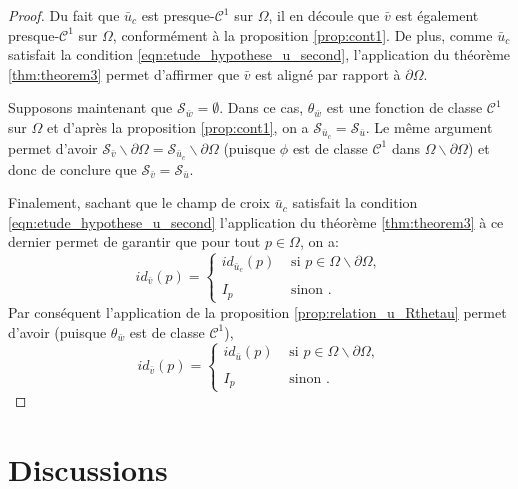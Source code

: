 \begin{proof}
Du fait que $\bar{u}_c$ est presque-$\mathcal{C}^1$ sur $\Omega$, il en découle que $\bar{v}$ est également presque-$\mathcal{C}^1$ sur $\Omega$, conformément à la proposition \ref{prop:cont1}. De plus, comme $\bar{u}_c$ satisfait la condition \eqref{eqn:etude_hypothese_u_second}, l'application du théorème \ref{thm:theorem3} permet d'affirmer que $\bar{v}$ est aligné par rapport à $\partial\Omega$.


Supposons maintenant que $\mathcal{S}_{\bar{w}}=\emptyset$. Dans ce cas, $\theta_{\bar{w}}$ est une fonction de classe $\mathcal{C}^1$ sur $\Omega$ et d'après la proposition \ref{prop:cont1}, on a $\mathcal{S}_{\bar{u}_c}=\mathcal{S}_{\bar{u}}$. Le même argument permet d'avoir $\mathcal{S}_{\bar{v}}\backslash\partial\Omega=\mathcal{S}_{\bar{u}_c}\backslash\partial\Omega$ (puisque $\phi$ est de classe $\mathcal{C}^1$ dans $\Omega\backslash\partial\Omega$) et donc de conclure que $\mathcal{S}_{\bar{v}}=\mathcal{S}_{\bar{u}}$.

Finalement, sachant que le champ de croix $\bar{u}_c$ satisfait la condition \eqref{eqn:etude_hypothese_u_second} l'application du théorème \ref{thm:theorem3} à ce dernier permet de garantir que pour tout $p\in\Omega$, on a:
\begin{equation}
id_{\bar{v}}(p)=
\left\{
\begin{array}{ll}
    id_{\bar{u}_c}(p) & \mbox{ si } p\in\Omega\backslash\partial\Omega,\\\\
    I_p & \mbox{ sinon }.
\end{array}
\right.
\end{equation}
Par conséquent l'application de la proposition \ref{prop:relation_u_Rthetau} permet d'avoir (puisque $\theta_{\bar{w}}$ est de classe $\mathcal{C}^1$),
\begin{equation}
id_{\bar{v}}(p)=
\left\{
\begin{array}{ll}
    id_{\bar{u}}(p) & \mbox{ si } p\in\Omega\backslash\partial\Omega,\\\\
    I_p & \mbox{ sinon }.
\end{array}
\right.
\end{equation}
\end{proof}



\section{Discussions}
\label{sec:discussion}

